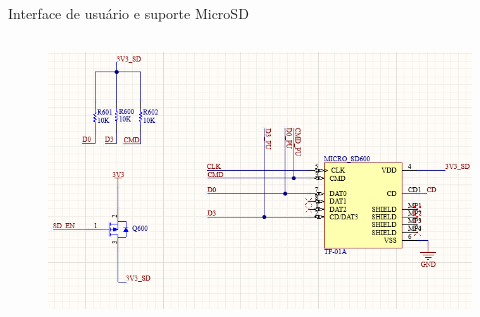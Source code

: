 \begin{frame}{Interface de usuário e suporte MicroSD}
{\begin{columns}
                \begin{figure}
                    \centering
                    \includegraphics[width=\textwidth]{figuras/cap3/esquematicos/sdcard.png}
                    \vspace{-15pt}
                \end{figure}
        
        \end{columns}
    }


 
        
                   

        
        
        
        



\end{frame}

